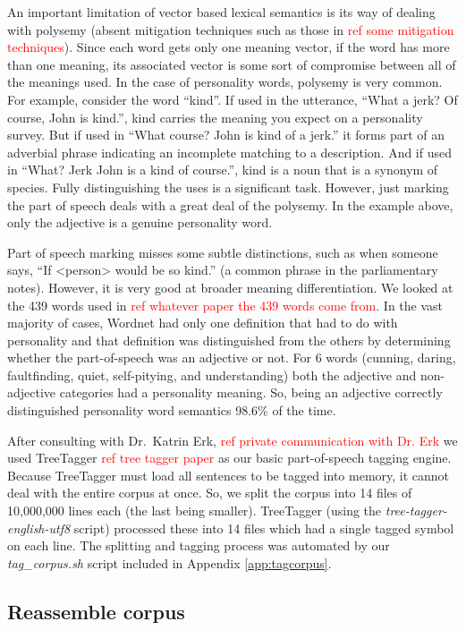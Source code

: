 \documentclass[10pt,letterpaper]{book}
\newcommand{\todo}[1]{\textcolor{red}{#1}}
\newcommand{\filename}[1]{\textit{#1}}
\begin{document}
An important limitation of vector based lexical semantics is its way of dealing with polysemy (absent mitigation techniques such as those in \todo{ref some mitigation techniques}). Since each word gets only one meaning vector, if the word has more than one meaning, its associated vector is some sort of compromise between all of the meanings used. In the case of personality words, polysemy is very common. For example, consider the word ``kind''. If used in the utterance, ``What a jerk? Of course, John is kind.'', kind carries the meaning you expect on a personality survey. But if used in ``What course? John is kind of a jerk.'' it forms part of an adverbial phrase indicating an incomplete matching to a description. And if used in ``What? Jerk John is a kind of course.'', kind is a noun that is a synonym of species. Fully distinguishing the uses is a significant task. However, just marking the part of speech deals with a great deal of the polysemy. In the example above, only the adjective is a genuine personality word. 

Part of speech marking misses some subtle distinctions, such as when someone says, ``If <person> would be so kind.'' (a common phrase in the parliamentary notes). However, it is very good at broader meaning differentiation. We looked at the 439 words used in \todo{ref whatever paper the 439 words come from}. In the vast majority of cases, Wordnet had only one definition that had to do with personality and that definition was distinguished from the others by determining whether the part-of-speech was an adjective or not. For 6 words (cunning, daring, faultfinding, quiet, self-pitying, and understanding) both the adjective and non-adjective categories had a personality meaning. So, being an adjective correctly distinguished personality word semantics 98.6\% of the time.

After consulting with Dr.\ Katrin Erk, \todo{ref private communication with Dr. Erk} we used TreeTagger \todo{ref tree tagger paper} as our basic part-of-speech tagging engine. Because TreeTagger must load all sentences to be tagged into memory, it cannot deal with the entire corpus at once. So, we split the corpus into 14 files of 10,000,000 lines each (the last being smaller). TreeTagger (using the \filename{tree-tagger-english-utf8} script) processed these into 14 files which had a single tagged symbol on each line. The splitting and tagging process was automated by our \filename{tag\_corpus.sh} script included in Appendix \ref{app:tagcorpus}.

\subsection{Reassemble corpus}
\end{document}
